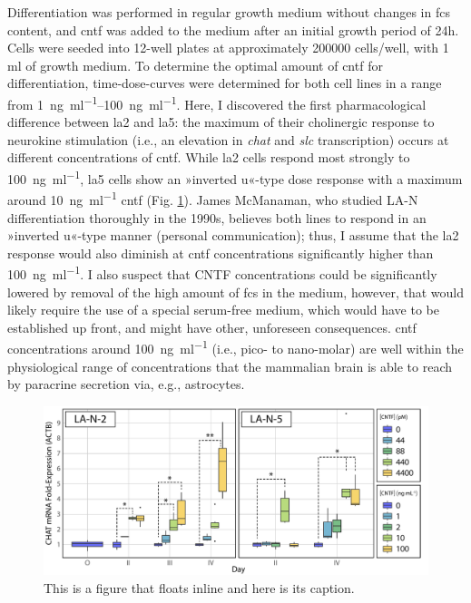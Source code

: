 Differentiation was performed in regular growth medium without changes in \ac{fcs} content, and \ac{cntf} was added to the medium after an initial growth period of 24h. Cells were seeded into 12-well plates at approximately \num{200000} cells/well, with 1 ml of growth medium. To determine the optimal amount of \ac{cntf} for differentiation, time-dose-curves were determined for both cell lines in a range from \SIrange{1}{100}{\nano\gram\per\milli\litre}. Here, I discovered the first pharmacological difference between \ac{la2} and \ac{la5}: the maximum of their cholinergic response to neurokine stimulation (i.e., an elevation in \textit{\ac{chat}} and \textit{\ac{slc}} transcription) occurs at different concentrations of \ac{cntf}. While \ac{la2} cells respond most strongly to \SI{100}{\nano\gram\per\milli\litre}, \ac{la5} cells show an »inverted u«-type dose response with a maximum around \SI{10}{\nano\gram\per\milli\litre} \ac{cntf} (Fig. \ref{fig:time-dose}). James McManaman, who studied LA-N differentiation thoroughly in the 1990s\cite{McManaman1991}, believes both lines to respond in an »inverted u«-type manner (personal communication); thus, I assume that the \ac{la2} response would also diminish at \ac{cntf} concentrations significantly higher than \SI{100}{\nano\gram\per\milli\litre}. I also suspect that CNTF concentrations could be significantly lowered by removal of the high amount of \ac{fcs} in the medium, however, that would likely require the use of a special serum-free medium, which would have to be established up front, and might have other, unforeseen consequences. \ac{cntf} concentrations around \SI{100}{\nano\gram\per\milli\litre} (i.e., pico- to nano-molar) are well within the physiological range of concentrations that the mammalian brain is able to reach by paracrine secretion via, e.g., astrocytes\cite{Sun2016}.

\begin{figure}
\includegraphics[width=\textwidth]{figures/time-dose}
\caption[Short figure name.]{This is a figure that floats inline and here is its caption.
\label{fig:time-dose}}
\end{figure}

